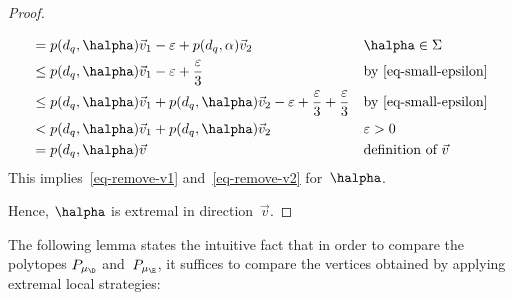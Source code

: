 \begin{proof}
\begin{itemize}
\begin{align*}
&  =  p(d_q, \halpha) \vec{v}_1 - \varepsilon + p(d_q, \alpha) \vec{v}_2 && \halpha \in \Sigma \\
& \le p(d_q, \halpha) \vec{v}_1 - \varepsilon + \frac{\varepsilon}{3} && \text{by~\eqref{eq-small-epsilon}} \\
& \le p(d_q, \halpha) \vec{v}_1 + p(d_q, \halpha) \vec{v}_2 - \varepsilon + \frac{\varepsilon}{3} + \frac{\varepsilon}{3} && \text{by~\eqref{eq-small-epsilon}} \\
& < p(d_q, \halpha) \vec{v}_1 + p(d_q, \halpha) \vec{v}_2 && \varepsilon > 0 \\
& = p(d_q, \halpha) \vec{v} && \text{definition of~$\vec{v}$}
\end{align*}
This implies~\eqref{eq-remove-v1} and~\eqref{eq-remove-v2} for~$\halpha$.
\end{itemize}
Hence, $\halpha$ is extremal in direction~$\vec{v}$.
\end{proof}

The following lemma states the intuitive fact that in order to compare the polytopes $P_{\mu_\D}$ and~$P_{\mu_\E}$, it suffices to compare the vertices obtained by applying extremal local strategies:

